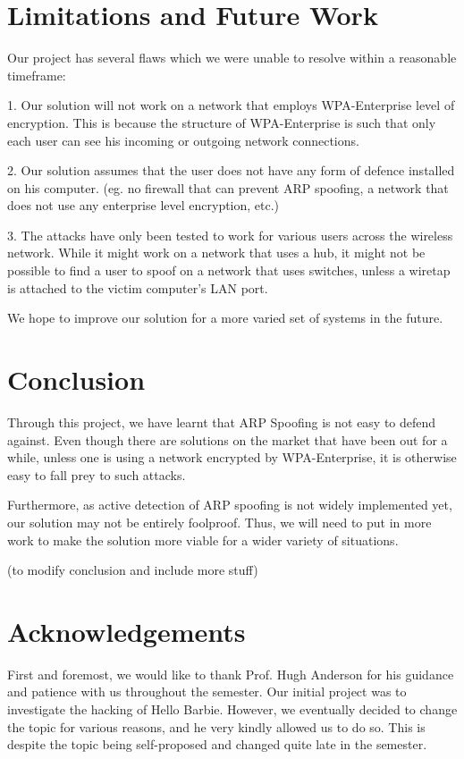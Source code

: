 \documentclass{acm_proc_article-sp}
\begin{document}
\section{Limitations and Future Work}
Our project has several flaws which we were unable to resolve within a reasonable timeframe: 

1. Our solution will not work on a network that employs WPA-Enterprise level of encryption. This is because the structure of WPA-Enterprise is such that only each user can see his incoming or outgoing network connections. 

2. Our solution assumes that the user does not have any form of defence installed on his computer. (eg. no firewall that can prevent ARP spoofing, a network that does not use any enterprise level encryption, etc.) 

3. The attacks have only been tested to work for various users across the wireless network. While it might work on a network that uses a hub, it might not be possible to find a user to spoof on a network that uses switches, unless a wiretap is attached to the victim computer's LAN port.  

We hope to improve our solution for a more varied set of systems in the future. 

\section{Conclusion}
Through this project, we have learnt that ARP Spoofing is not easy to defend against. Even though there are solutions on the market that have been out for a while, unless one is using a network encrypted by WPA-Enterprise, it is otherwise easy to fall prey to such attacks. 

Furthermore, as active detection of ARP spoofing is not widely implemented yet, our solution may not be entirely foolproof. Thus, we will need to put in more work to make the solution more viable for a wider variety of situations. 

(to modify conclusion and include more stuff) 

\section{Acknowledgements}
First and foremost, we would like to thank Prof. Hugh Anderson for his guidance and patience with us throughout the semester. Our initial project was to investigate the hacking of Hello Barbie. However, we eventually decided to change the topic for various reasons, and he very kindly allowed us to do so. This is despite the topic being self-proposed and changed quite late in the semester. 
\end{document}
